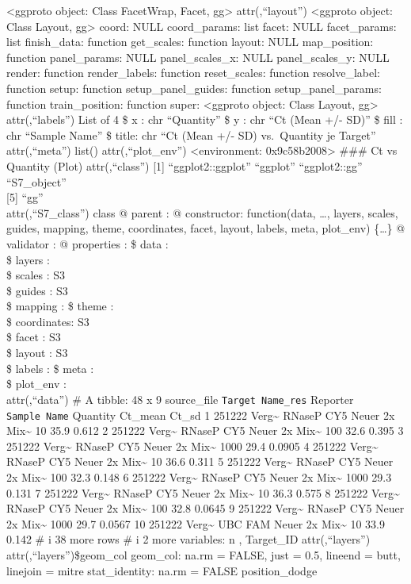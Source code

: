 \documentclass[
]{article}
\begin{document}
\textless ggproto object: Class FacetWrap, Facet, gg\textgreater{}
attr(,``layout'') \textless ggproto object: Class Layout,
gg\textgreater{} coord: NULL coord\_params: list facet: NULL
facet\_params: list finish\_data: function get\_scales: function layout:
NULL map\_position: function panel\_params: NULL panel\_scales\_x: NULL
panel\_scales\_y: NULL render: function render\_labels: function
reset\_scales: function resolve\_label: function setup: function
setup\_panel\_guides: function setup\_panel\_params: function
train\_position: function super: \textless ggproto object: Class Layout,
gg\textgreater{} attr(,``labels'') List of 4 \$ x : chr ``Quantity'' \$
y : chr ``Ct (Mean +/- SD)'' \$ fill : chr ``Sample Name'' \$ title: chr
``Ct (Mean +/- SD) vs.~Quantity je Target'' attr(,``meta'') list()
attr(,``plot\_env'') \textless environment: 0x9c58b2008\textgreater{}
\n\#\#\# Ct vs Quantity (Plot) \n\n attr(,``class'') {[}1{]}
``ggplot2::ggplot'' ``ggplot'' ``ggplot2::gg'' ``S7\_object''\\
{[}5{]} ``gg''\\
attr(,``S7\_class'') class @ parent : @ constructor: function(data,
\ldots, layers, scales, guides, mapping, theme, coordinates, facet,
layout, labels, meta, plot\_env) \{\ldots\} @ validator : @ properties :
\$ data : \\
\$ layers : \\
\$ scales : S3\\
\$ guides : S3\\
\$ mapping : \$ theme : \\
\$ coordinates: S3\\
\$ facet : S3\\
\$ layout : S3\\
\$ labels : \$ meta : \\
\$ plot\_env : \\
attr(,``data'') \# A tibble: 48 x 9 source\_file
\texttt{Target\ Name\_res} Reporter \texttt{Sample\ Name} Quantity
Ct\_mean Ct\_sd 1 251222 Verg\textasciitilde{} RNaseP CY5 Neuer 2x
Mix\textasciitilde{} 10 35.9 0.612 2 251222 Verg\textasciitilde{} RNaseP
CY5 Neuer 2x Mix\textasciitilde{} 100 32.6 0.395 3 251222
Verg\textasciitilde{} RNaseP CY5 Neuer 2x Mix\textasciitilde{} 1000 29.4
0.0905 4 251222 Verg\textasciitilde{} RNaseP CY5 Neuer 2x
Mix\textasciitilde{} 10 36.6 0.311 5 251222 Verg\textasciitilde{} RNaseP
CY5 Neuer 2x Mix\textasciitilde{} 100 32.3 0.148 6 251222
Verg\textasciitilde{} RNaseP CY5 Neuer 2x Mix\textasciitilde{} 1000 29.3
0.131 7 251222 Verg\textasciitilde{} RNaseP CY5 Neuer 2x
Mix\textasciitilde{} 10 36.3 0.575 8 251222 Verg\textasciitilde{} RNaseP
CY5 Neuer 2x Mix\textasciitilde{} 100 32.8 0.0645 9 251222
Verg\textasciitilde{} RNaseP CY5 Neuer 2x Mix\textasciitilde{} 1000 29.7
0.0567 10 251222 Verg\textasciitilde{} UBC FAM Neuer 2x
Mix\textasciitilde{} 10 33.9 0.142 \# i 38 more rows \# i 2 more
variables: n , Target\_ID attr(,``layers'') attr(,``layers'')\$geom\_col
geom\_col: na.rm = FALSE, just = 0.5, lineend = butt, linejoin = mitre
stat\_identity: na.rm = FALSE position\_dodge
\end{document}
